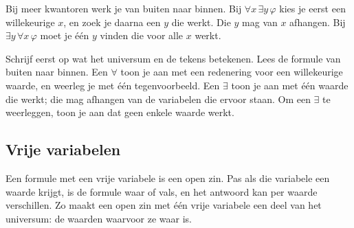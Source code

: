 Bij meer kwantoren werk je van buiten naar binnen. Bij $\forall x\, \exists y\, \varphi$ kies je eerst een willekeurige $x$, en zoek je daarna een $y$ die werkt. Die $y$ mag van $x$ afhangen. Bij $\exists y\, \forall x\, \varphi$ moet je één $y$ vinden die voor alle $x$ werkt.


\begin{werkwijze}
Schrijf eerst op wat het universum en de tekens betekenen. Lees de formule van buiten naar binnen. Een $\forall$ toon je aan met een redenering voor een willekeurige waarde, en weerleg je met één tegenvoorbeeld. Een $\exists$ toon je aan met één waarde die werkt; die mag afhangen van de variabelen die ervoor staan. Om een $\exists$ te weerleggen, toon je aan dat geen enkele waarde werkt.
\end{werkwijze}

\begin{oefeningen}
\end{oefeningen}

\subsection{Vrije variabelen}

Een formule met een vrije variabele is een open zin. Pas als die variabele een waarde krijgt, is de formule waar of vals, en het antwoord kan per waarde verschillen. Zo maakt een open zin met één vrije variabele een deel van het universum: de waarden waarvoor ze waar is.


